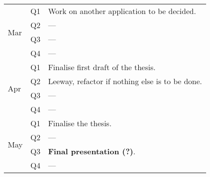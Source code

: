 \documentclass{article}
\begin{document}
\begin{table}[]
\begin{tabular}{lll}
\multirow{4}{*}{Mar} & Q1  & Work on another application to be decided. \\
                     & Q2  & --- \\
                     & Q3  & --- \\
                     & Q4  & --- \\ \hline
\multirow{4}{*}{Apr} & Q1  & Finalise first draft of the thesis. \\
                     & Q2  & Leeway, refactor if nothing else is to be done. \\
                     & Q3  & --- \\
                     & Q4  & --- \\ \hline
\multirow{4}{*}{May} & Q1  & Finalise the thesis. \\
                     & Q2  & --- \\
                     & Q3  & \textbf{Final presentation (?)}. \\
                     & Q4  & ---
\end{tabular}
\end{table}

\newpage


\end{document}
